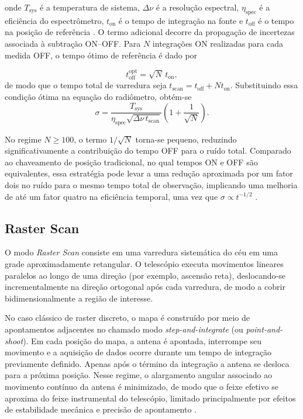 onde $T_{\mathrm{sys}}$ é a temperatura de sistema, $\Delta\nu$ é a resolução espectral, $\eta_{\mathrm{spec}}$ é a eficiência do espectrômetro, $t_{\mathrm{on}}$ é o tempo de integração na fonte e $t_{\mathrm{off}}$ é o tempo na posição de referência \cite{MangumEmersonGreisen2007_on_the_fly}. O termo adicional decorre da propagação de incertezas associada à subtração ON–OFF. Para $N$ integrações ON realizadas para cada medida OFF, o tempo ótimo de referência é dado por

\begin{equation}
t_{\mathrm{off}}^{\mathrm{opt}} = \sqrt{N}\, t_{\mathrm{on}},
\end{equation}
de modo que o tempo total de varredura seja $t_{\mathrm{scan}} = t_{\mathrm{off}} + N t_{\mathrm{on}}$. Substituindo essa condição ótima na equação do radiômetro, obtém-se
\begin{equation}
\sigma =
\frac{T_{\mathrm{sys}}}
{\eta_{\mathrm{spec}}\sqrt{\Delta\nu\, t_{\mathrm{scan}}}}
\left(1 + \frac{1}{\sqrt{N}}\right).
\end{equation}

No regime $N \ge 100$, o termo $1/\sqrt{N}$ torna-se pequeno, reduzindo significativamente a contribuição do tempo OFF para o ruído total. Comparado ao chaveamento de posição tradicional, no qual tempos ON e OFF são equivalentes, essa estratégia pode levar a uma redução aproximada por um fator dois no ruído para o mesmo tempo total de observação, implicando uma melhoria de até um fator quatro na eficiência temporal, uma vez que $\sigma \propto t^{-1/2}$ \cite{MangumEmersonGreisen2007_on_the_fly}.


\subsection{Raster Scan}

O modo \textit{Raster Scan} consiste em uma varredura sistemática do céu em uma grade aproximadamente retangular. O telescópio executa movimentos lineares paralelos ao longo de uma direção (por exemplo, ascensão reta), deslocando-se incrementalmente na direção ortogonal após cada varredura, de modo a cobrir bidimensionalmente a região de interesse.

No caso clássico de raster discreto, o mapa é construído por meio de apontamentos adjacentes no chamado modo \textit{step-and-integrate} (ou \textit{point-and-shoot}). Em cada posição do mapa, a antena é apontada, interrompe seu movimento e a aquisição de dados ocorre durante um tempo de integração previamente definido. Apenas após o término da integração a antena se desloca para a próxima posição. Nesse regime, o alargamento angular associado ao movimento contínuo da antena é minimizado, de modo que o feixe efetivo se aproxima do feixe instrumental do telescópio, limitado principalmente por efeitos de estabilidade mecânica e precisão de apontamento \cite{INAF_MappingTechniques_raster}.

